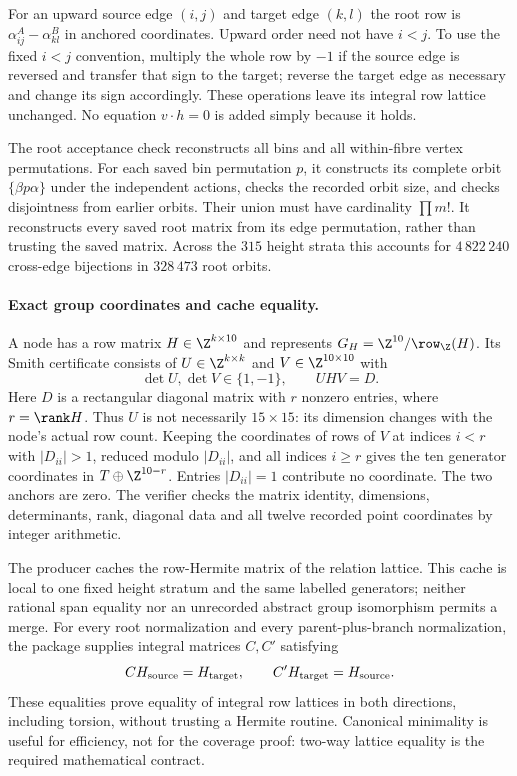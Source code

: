 For an upward source edge $(i,j)$ and target edge $(k,l)$ the root row
is $\alpha_{ij}^A-\alpha_{kl}^B$ in anchored coordinates. Upward order
need not have $i<j$. To use the fixed $i<j$ convention, multiply the
whole row by $-1$ if the source edge is reversed and transfer that
sign to the target; reverse the target edge as necessary and change
its sign accordingly. These operations leave its integral row lattice
unchanged. No equation $v\cdot h=0$ is added simply because it holds.

The root acceptance check reconstructs all bins and all within-fibre
vertex permutations. For each saved bin permutation $p$, it constructs
its complete orbit $\{\beta p\alpha\}$ under the independent actions,
checks the recorded orbit size, and checks disjointness from earlier
orbits. Their union must have cardinality $\prod m!$. It reconstructs
every saved root matrix from its edge permutation, rather than trusting
the saved matrix. Across the $315$ height strata this accounts for
$4\,822\,240$ cross-edge bijections in $328\,473$ root orbits.

\paragraph{Exact group coordinates and cache equality.}
A node has a row matrix $H\in\Z^{k\times10}$ and represents
$G_H=\Z^{10}/\row_\Z(H)$. Its Smith certificate consists of
$U\in\Z^{k\times k}$ and $V\in\Z^{10\times10}$ with
\[
 \det U,\det V\in\{1,-1\},\qquad UHV=D.
\]
Here $D$ is a rectangular diagonal matrix with $r$ nonzero entries,
where $r=\rank H$. Thus $U$ is not necessarily $15\times15$:
its dimension changes with the node's actual row count. Keeping the
coordinates of rows of $V$ at indices $i<r$ with $|D_{ii}|>1$, reduced
modulo $|D_{ii}|$, and all indices $i\ge r$ gives the ten generator
coordinates in $T\oplus\Z^{10-r}$. Entries $|D_{ii}|=1$ contribute
no coordinate. The two anchors are zero. The verifier checks the
matrix identity, dimensions, determinants, rank, diagonal data and all
twelve recorded point coordinates by integer arithmetic.

The producer caches the row-Hermite matrix of the relation lattice.
This cache is local to one fixed height stratum and the same labelled
generators; neither rational span equality nor an unrecorded abstract
group isomorphism permits a merge. For every root normalization and
every parent-plus-branch normalization, the package supplies integral
matrices $C,C'$ satisfying
\[
 C H_{\rm source}=H_{\rm target},\qquad
 C'H_{\rm target}=H_{\rm source}.
\]
These equalities prove equality of integral row lattices in both
directions, including torsion, without trusting a Hermite routine.
Canonical minimality is useful for efficiency, not for the coverage
proof: two-way lattice equality is the required mathematical contract.

